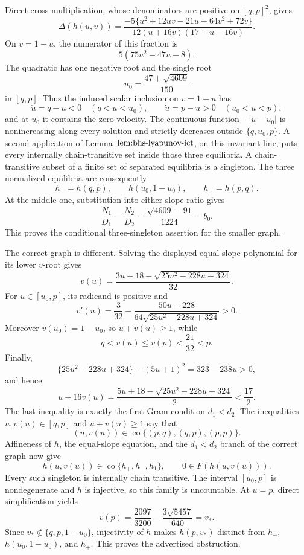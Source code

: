 Direct cross-multiplication, whose denominators are positive on \([q,p]^2\), gives
\[
 \Delta(h(u,v))
 =\frac{-5\{u^2+12uv-21u-64v^2+72v\}}
 {12(u+16v)(17-u-16v)}.
\]
On \(v=1-u\), the numerator of this fraction is
\[
 5(75u^2-47u-8).
\]
The quadratic has one negative root and the single root
\[
 u_0=\frac{47+\sqrt{4609}}{150}
\]
in \([q,p]\).  Thus the induced scalar inclusion on \(v=1-u\) has
\[
 \dot u=q-u<0\quad(q<u<u_0),
 \qquad
 \dot u=p-u>0\quad(u_0<u<p),
\]
and at \(u_0\) it contains the zero velocity.  The continuous function \(-|u-u_0|\) is nonincreasing along every solution and strictly decreases outside \(\{q,u_0,p\}\).  A second application of Lemma~\(\textnormal{lem:bhs-lyapunov-ict}\), on this invariant line, puts every internally chain-transitive set inside those three equilibria.  A chain-transitive subset of a finite set of separated equilibria is a singleton.  The three normalized equilibria are consequently
\[
 h_-=h(q,p),\qquad h(u_0,1-u_0),\qquad h_+=h(p,q).
\]
At the middle one, substitution into either slope ratio gives
\[
 \frac{N_1}{D_1}=\frac{N_2}{D_2}
 =\frac{\sqrt{4609}-91}{1224}=b_0.
\]
This proves the conditional three-singleton assertion for the smaller graph.

The correct graph is different.  Solving the displayed equal-slope polynomial for its lower \(v\)-root gives
\[
 v(u)=\frac{3u+18-\sqrt{25u^2-228u+324}}{32}.
\]
For \(u\in[u_0,p]\), its radicand is positive and
\[
 v'(u)=\frac3{32}-
 \frac{50u-228}{64\sqrt{25u^2-228u+324}}>0.
\]
Moreover \(v(u_0)=1-u_0\), so \(u+v(u)\ge1\), while
\[
 q<v(u)\le v(p)<\frac{21}{32}<p.
\]
Finally,
\[
 \{25u^2-228u+324\}-(5u+1)^2=323-238u>0,
\]
and hence
\[
 u+16v(u)=\frac{5u+18-\sqrt{25u^2-228u+324}}2<\frac{17}{2}.
\]
The last inequality is exactly the first-Gram condition \(d_1<d_2\).  The inequalities \(u,v(u)\in[q,p]\) and \(u+v(u)\ge1\) say that
\[
 (u,v(u))\in\operatorname{co}\{(p,q),(q,p),(p,p)\}.
\]
Affineness of \(h\), the equal-slope equation, and the \(d_1<d_2\) branch of the correct graph now give
\[
 h(u,v(u))\in\operatorname{co}\{h_+,h_-,h_1\},
 \qquad
 0\in F(h(u,v(u))).
\]
Every such singleton is internally chain transitive.  The interval \([u_0,p]\) is nondegenerate and \(h\) is injective, so this family is uncountable.  At \(u=p\), direct simplification yields
\[
 v(p)=\frac{2097}{3200}-\frac{3\sqrt{5457}}{640}=v_*.
\]
Since \(v_*\notin\{q,p,1-u_0\}\), injectivity of \(h\) makes \(h(p,v_*)\) distinct from \(h_-\), \(h(u_0,1-u_0)\), and \(h_+\).  This proves the advertised obstruction.


